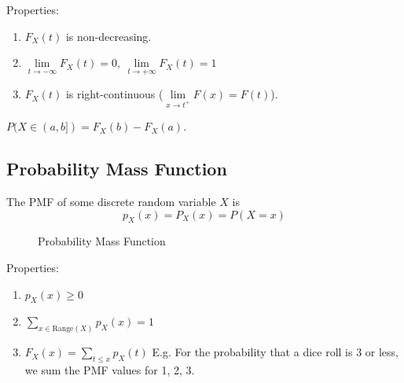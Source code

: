 \documentclass[../Probability.tex]{subfiles}
\begin{document}
\noindent Properties:
\begin{enumerate}
    \item $F_X(t)$ is non-decreasing.
    \item $\lim\limits_{t\to -\infty}F_X(t) = 0,\: \lim\limits_{t\to +\infty}F_X(t) = 1$
    \item $F_X(t)$ is right-continuous ($\lim\limits_{x\to t^{+}}F(x) = F(t)$).
\end{enumerate}
$P(X\in (a, b]) = F_X(b) - F_X(a)$.

\subsection{Probability Mass Function}
The PMF of some discrete random variable $X$ is
\[p_X(x) = P_X({x}) = P(X = x)\]

\begin{figure}[h] %
    \centering
    \caption*{Probability Mass Function} %
\end{figure}

\noindent Properties:
\begin{enumerate}
    \item $p_X(x) \geq 0$
    \item $\sum\limits_{x\in \text{Range}(X)}p_X(x) = 1$
    \item $F_X(x) = \sum\limits_{t\leq x}p_X(t)$ \newline
    E.g. For the probability that a dice roll is 3 or less,
    we sum the PMF values for 1, 2, 3.
\end{enumerate}
\end{document}
